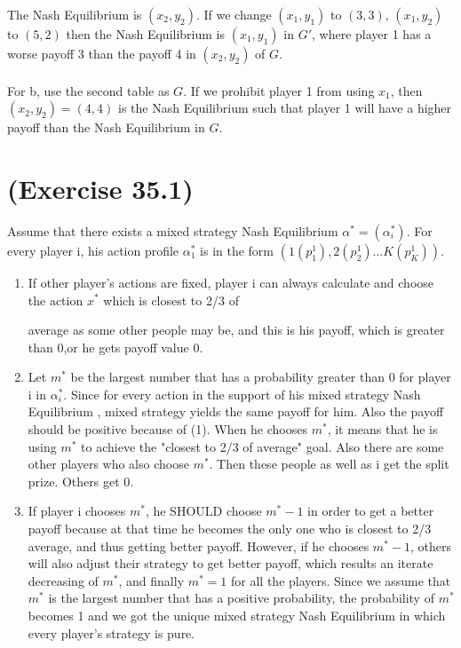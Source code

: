 \def\CTeXPreproc{Created by ctex v0.2.12, don't edit!}\documentclass[a4paper,12pt]{article}
\newcommand{\NE}{Nash Equilibrium }
\begin{document}
\begin{enumerate}[a.]
The \NE is $(x_2,y_2)$. If we change $(x_1,y_1)$ to $(3,3)$,
$(x_1,y_2)$ to $(5,2)$ then the \NE is $(x_1,y_1)$ in $G'$, where
player 1 has a worse payoff 3 than the payoff 4 in $(x_2,y_2)$
of $G$.\\\\
For b, use the second table as $G$. If we prohibit player 1 from
using $x_1$, then $(x_2,y_2)=(4,4)$ is the \NE such that player 1
will have a higher payoff than the \NE in $G$.
\end{enumerate}

\section{(Exercise 35.1)}
Assume that there exists a mixed strategy \NE
$\alpha^*=(\alpha_i^*)$. For every player i, his action profile
$\alpha^*_1$ is in the form $(1(p_1^1),2(p_2^1)\ldots K(p_K^1))$.
\begin{enumerate}
\item If other player's actions are fixed, player i can always
calculate and choose the action $x^*$ which is closest to 2/3 of

average as some other people may be, and this is his payoff, which
is greater than 0,or he gets payoff value 0.
\item Let $m^*$ be the largest number that has a probability greater
than 0 for player i in $\alpha_i^*$. Since for every action in the
support of his mixed strategy \NE, mixed strategy yields the same
payoff for him. Also the payoff should be positive because of (1).
When he chooses $m^*$, it means that he is using $m^*$ to achieve
the "closest to 2/3 of average" goal. Also there are some other
players who also choose $m^*$. Then these people as well as i get
the split prize. Others get 0.
\item If player i chooses $m^*$, he SHOULD choose $m^*-1$ in order to
get a better payoff because at that time he becomes the only one who
is closest to 2/3 average, and thus getting better payoff. However,
if he chooses $m^*-1$, others will also adjust their strategy to get
better payoff, which results an iterate decreasing of $m^*$, and
finally $m^*=1$ for all the players. Since we assume that $m^*$ is
the largest number that has a positive probability, the probability
of $m^*$ becomes 1 and we got the unique mixed strategy \NE in which
every player's strategy is pure.
\end{enumerate}
\end{document}
